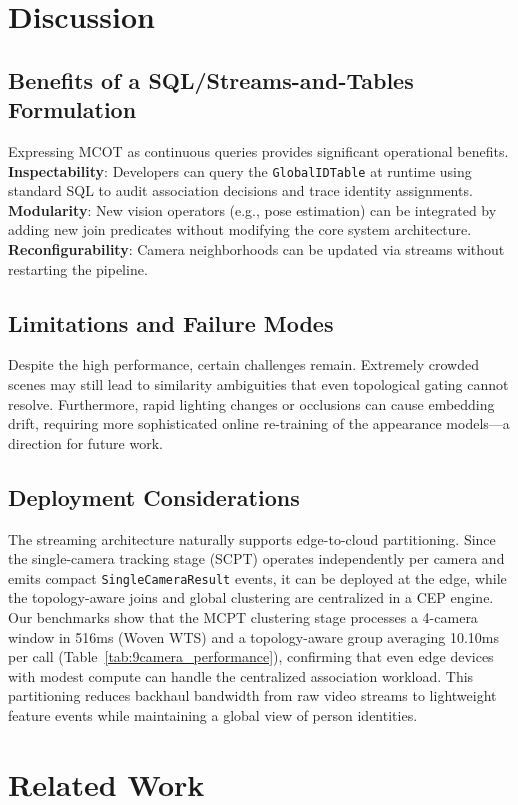 \documentclass[review]{elsarticle}
\begin{document}
\section{Discussion}\label{sec:discussion}
\subsection{Benefits of a SQL/Streams-and-Tables Formulation}
Expressing MCOT as continuous queries provides significant operational benefits. \textbf{Inspectability}: Developers can query the \texttt{GlobalIDTable} at runtime using standard SQL to audit association decisions and trace identity assignments. \textbf{Modularity}: New vision operators (e.g., pose estimation) can be integrated by adding new join predicates without modifying the core system architecture. \textbf{Reconfigurability}: Camera neighborhoods can be updated via streams without restarting the pipeline.

\subsection{Limitations and Failure Modes}
Despite the high performance, certain challenges remain. Extremely crowded scenes may still lead to similarity ambiguities that even topological gating cannot resolve. Furthermore, rapid lighting changes or occlusions can cause embedding drift, requiring more sophisticated online re-training of the appearance models—a direction for future work.

\subsection{Deployment Considerations}
The streaming architecture naturally supports edge-to-cloud partitioning. Since the single-camera tracking stage (SCPT) operates independently per camera and emits compact \texttt{SingleCameraResult} events, it can be deployed at the edge, while the topology-aware joins and global clustering are centralized in a CEP engine. Our benchmarks show that the MCPT clustering stage processes a 4-camera window in 516ms (Woven WTS) and a topology-aware group averaging 10.10ms per call (Table~\ref{tab:9camera_performance}), confirming that even edge devices with modest compute can handle the centralized association workload. This partitioning reduces backhaul bandwidth from raw video streams to lightweight feature events while maintaining a global view of person identities.

\section{Related Work}\label{sec:related}
\end{document}
